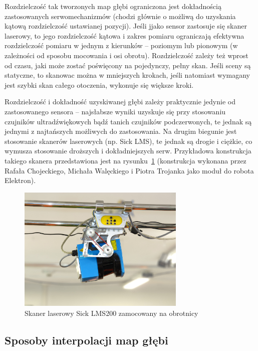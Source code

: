 Rozdzielczość tak tworzonych map głębi ograniczona jest dokładnością
zastosowanych serwomechanizmów (chodzi głównie o możliwą do uzyskania
kątową rozdzielczość ustawianej pozycji). Jeśli jjako sensor zastosuje się
skaner laserowy, to jego rozdzielczość kątowa i zakres pomiaru ograniczają
efektywna rozdzielczość pomiaru w jednym z kierunków -- poziomym lub pionowym
(w zależności od sposobu mocowania i osi obrotu). Rozdzielczość zależy też
wprost od czasu, jaki może zostać poświęcony na pojedynczy, pełny skan. Jeśli
sceny są statyczne, to skanowac można w mniejszych krokach, jeśli natomiast
wymagany jest szybki skan całego otoczenia, wykonuje się większe kroki.

Rozdzielczość i dokładność uzyskiwanej głębi zależy praktycznie jedynie od
zastosowanego sensora -- najsłabsze wyniki uzyskuje się przy stosowaniu
czujników ultradźwiękowych bądź tanich czujników podczerwonych, te jednak są
jednymi z najtańszych możliwych do zastosowania. Na drugim biegunie jest
stosowanie skanerów laserowych (np. Sick LMS), te jednak są drogie i ciężkie, co
wymusza stosowanie droższych i dokładniejszych serw. Przykładowa konstrukcja
takiego skanera przedstawiona jest na rysunku~\ref{fig:sick_obrotnica}
(konstrukcja wykonana przez Rafała Chojeckiego, Michała Walęckiego i Piotra
Trojanka jako moduł do robota Elektron).
 
\begin{figure}[h!]
\centering
\includegraphics[height=6cm]{../../Common/img/sick_obrotnica} 
\caption{Skaner laserowy Sick LMS200 zamocowany na obrotnicy}
\label{fig:sick_obrotnica}
\end{figure}

\subsection{Sposoby interpolacji map głębi} 

